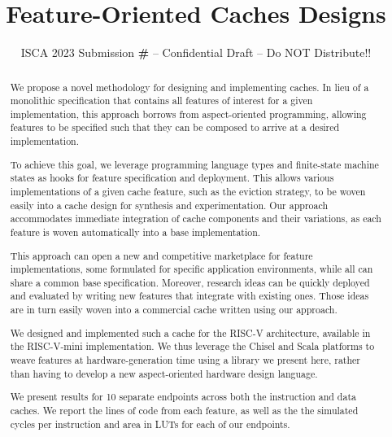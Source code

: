 \documentclass[conference]{IEEEtran}
\title{Feature-Oriented Caches Designs}
\author{\normalsize{ISCA 2023 Submission
    \textbf{\#\iscasubmissionnumber} -- Confidential Draft -- Do NOT Distribute!!}}
\begin{document}
\maketitle
\thispagestyle{plain}
\pagestyle{plain}



\def\Riscv{\mbox{RISC-V}}
\def\Riscvmini{\mbox{\Riscv{}-mini}}
\def\Rocketchip{\mbox{Rocket Chip}}

\begin{abstract}
We propose a novel methodology for designing and implementing caches.  In lieu of a monolithic specification that contains all features of interest for a given implementation, this approach borrows from aspect-oriented programming, allowing features to be specified such that they can be composed to arrive at a desired implementation.

To achieve this goal, we leverage programming language types and finite-state machine states as hooks for feature specification and deployment.  This allows various implementations of a given cache feature, such as the eviction strategy, to be woven easily into a cache design for synthesis and experimentation.  Our approach accommodates immediate integration of cache components and their variations, as each feature is woven automatically into a base implementation.

This approach can open a new and competitive marketplace for feature implementations, some formulated for specific application environments, while all can share a common base specification.  Moreover, research ideas can be quickly deployed and evaluated by writing new features that integrate with existing ones.  Those ideas are in turn easily woven into a commercial cache written using our approach. 

We designed and implemented such a cache for the \Riscv{} architecture, available in the \Riscvmini{} implementation.  We thus leverage the
Chisel and Scala platforms to weave features at hardware-generation time using a library we present here, rather than having to develop a new aspect-oriented hardware design language.

We present results for 10 separate endpoints across both the instruction and data caches. We report the lines of code from each feature, as well as the the simulated cycles per instruction and area in LUTs for each of our endpoints.

\end{abstract}
\end{document}

